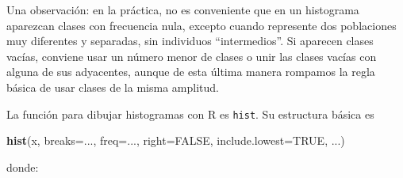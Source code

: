 \documentclass[]{book}
\newenvironment{Shaded}{\begin{snugshade}}{\end{snugshade}}
\newcommand{\DataTypeTok}[1]{\textcolor[rgb]{0.13,0.29,0.53}{#1}}
\newcommand{\KeywordTok}[1]{\textcolor[rgb]{0.13,0.29,0.53}{\textbf{#1}}}
\newcommand{\NormalTok}[1]{#1}
\newcommand{\OtherTok}[1]{\textcolor[rgb]{0.56,0.35,0.01}{#1}}
\theoremstyle{definition}
\theoremstyle{definition}
\theoremstyle{definition}
\theoremstyle{remark}
\begin{document}
Una observación: en la práctica, no es conveniente que en un histograma aparezcan clases con frecuencia nula, excepto cuando represente dos poblaciones muy diferentes y separadas, sin individuos ``intermedios''. Si aparecen clases vacías, conviene usar un número menor de clases o unir las clases vacías con alguna de sus adyacentes, aunque de esta última manera rompamos la regla básica de usar clases de la misma amplitud.

La función para dibujar histogramas con R es \texttt{hist}. Su estructura básica es

\begin{Shaded}
\begin{Highlighting}[]
\KeywordTok{hist}\NormalTok{(x, }\DataTypeTok{breaks=}\NormalTok{..., }\DataTypeTok{freq=}\NormalTok{..., }\DataTypeTok{right=}\OtherTok{FALSE}\NormalTok{, }\DataTypeTok{include.lowest=}\OtherTok{TRUE}\NormalTok{, ...)}
\end{Highlighting}
\end{Shaded}

donde:
\end{document}
